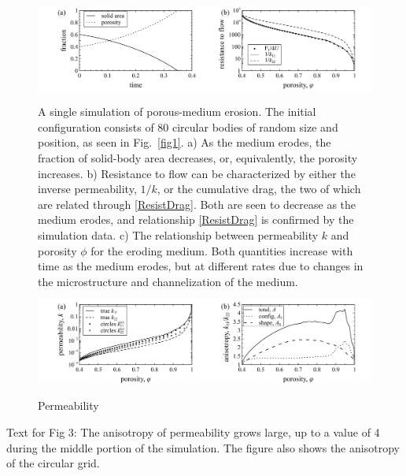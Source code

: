 \documentclass[3p]{elsarticle}
\newcommand{\vsp}[1]{\vspace{#1 pc} \noindent}
\newcommand{\nick}[1]{ {\color{red} #1} }
\begin{document}



\begin{figure}%
\centering \label{fig2}
\includegraphics[width = 0.99 \textwidth]{./figs/fig2.pdf}
\caption{A single simulation of porous-medium erosion. The initial configuration consists of 80 circular bodies of random size and position, as seen in Fig.~\ref{fig1}. a) As the medium erodes, the fraction of solid-body area decreases, or, equivalently, the porosity increases. b) Resistance to flow can be characterized by either the inverse permeability, $1/k$, or the cumulative drag, the two of which are related through \eqref{ResistDrag}. Both are seen to decrease as the medium erodes, and relationship \eqref{ResistDrag} is confirmed by the simulation data.
c) The relationship between permeability $k$ and porosity $\phi$ for the eroding medium. Both quantities increase with time as the medium erodes, but at different rates due to changes in the microstructure and channelization of the medium.
}
\end{figure}

\begin{figure}%
\centering \label{fig3}
\includegraphics[width = 0.99 \textwidth]{./figs/fig3.pdf}
\caption{
Permeability
}
\end{figure}

Text for Fig 3: 
The anisotropy of permeability grows large, up to a value of 4 during the middle portion of the simulation. The figure also shows the anisotropy of the circular grid.
\end{document}
